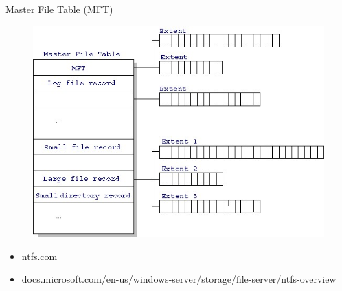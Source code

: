 \documentclass[12pt]{beamer}
\begin{document}
\begin{frame}{Master File Table (MFT)}
\begin{figure}
\includegraphics[scale=.7]{mft.jpg}
\end{figure}
\end{frame}

\begin{frame}
\small
\begin{itemize}
\small
\item ntfs.com
\item docs.microsoft.com/en-us/windows-server/storage/file-server/ntfs-overview
\end{itemize}
\end{frame}
\end{document}
